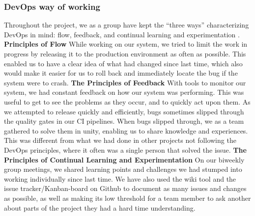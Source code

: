 \subsubsection{DevOps way of working}
Throughout the project, we as a group have kept the “three ways” characterizing DevOps in mind: 
flow, feedback, and continual learning and experimentation \cite{devopshandbook}.
\textbf{ Principles of Flow}
While working on our system, we tried to limit the work in progress by releasing it to the production environment as often as possible. This enabled us to have a clear idea of what had changed since last time, which also would make it easier for us to roll back and immediately locate the bug if the system were to crash.
\textbf{The Principles of Feedback}
With tools to monitor our system, we had constant feedback on how our system was performing. This was useful to get to see the problems as they occur, and to quickly act upon them. As we attempted to release quickly and efficiently, bugs sometimes slipped through the quality gates in our CI pipelines. When bugs slipped through, we as a team gathered to solve them in unity, enabling us to share knowledge and experiences. This was different from what we had done in other projects not following the DevOps principles, where it often was a single person that solved the issue.
\textbf{The Principles of Continual Learning and Experimentation}
On our biweekly group meetings, we shared learning points and challenges we had stumped into working individually since last time. We have also used the wiki tool and the issue tracker/Kanban-board on Github to document as many issues and changes as possible, as well as making its low threshold for a team member to ask another about parts of the project they had a hard time understanding.

